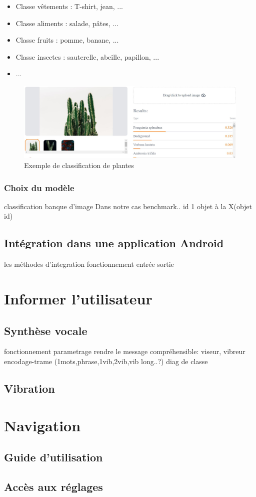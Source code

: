 \documentclass[UTF8]{EPURapport}
\begin{document}
\begin{itemize}
  \item Classe vêtements : T-shirt, jean, ...
  \item Classe aliments : salade, pâtes, ...
  \item Classe fruits : pomme, banane, ...  
  \item Classe insectes : sauterelle, abeille, papillon, ...
  \item  ...
\end{itemize}

\begin{figure}[h!]
\centering
  \includegraphics[width=\textwidth]{images/plants_classification.jpg}
  \caption{Exemple de classification de plantes}
  \label{fig:plantsclassification}
\end{figure}

\subsubsection{Choix du modèle}

classification
banque d'image
Dans notre cas 
benchmark..
id 1 objet à la X(objet id)
\subsection{Intégration dans une application Android}
les méthodes d'integration
fonctionnement
entrée sortie

\section{Informer l'utilisateur}
\subsection{Synthèse vocale}
fonctionnement
parametrage
rendre le message compréhensible: viseur,
vibreur
encodage-trame (1mots,phrase,1vib,2vib,vib long..?)
diag de classe

\subsection{Vibration}

\section{Navigation}
\subsection{Guide d'utilisation}
\subsection{Accès aux réglages}

\annexes
\end{document}

